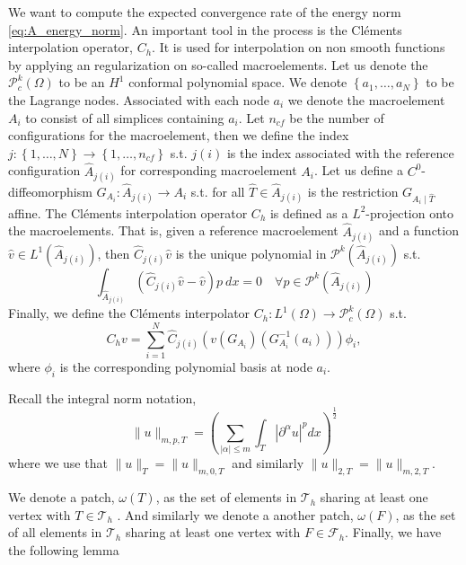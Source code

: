 We want to compute the expected convergence rate of the energy norm \eqref{eq:A_energy_norm}. An important tool in the process is the Cléments interpolation operator, $C_{h}$.
It is used for interpolation on non smooth functions by applying an regularization on so-called macroelements. Let us denote the $\mathcal{P}_{c}^{k}( \Omega )  $ to be an $H^{1}$ conformal polynomial space. We denote $\left\{ a_{1}, \ldots, a_{N}
\right\} $ to be the Lagrange nodes. Associated with each node $a_{i}$ we denote the macroelement $A_{i}$ to consist of all simplices containing $a_{i}$. Let $n_{cf}$ be the number of configurations for the macroelement, then we define the index $j:
\left\{ 1,\ldots,N \right\} \to \left\{ 1, \ldots, n_{cf} \right\}  $ s.t. $j( i) $ is the index associated with the reference configuration $\widehat{A}_{j(i) }$ for corresponding macroelement $A_{i}$. Let us define a $C^{0}$-diffeomorphism $G_{A_{i}}:
\widehat{A}_{j( i) } \to A_{i}$ s.t. for all $\widehat{T} \in \widehat{A}_{j( i) } $ is the restriction $G_{A_{i}  \mid \widehat{T}}$ affine. The Cléments interpolation operator $C_{h}$ is defined as a $L^2$-projection onto the macroelements. That is, given
a reference macroelement $\widehat{A}_{j( i) }$ and a function $\hat{v} \in L^{1}( \widehat{A}_{j( i) })  $, then $\widehat{C}_{j( i) } \hat{v}$  is the unique polynomial in $\mathcal{P}^{k} ( \widehat{A}_{j( i) })  $ s.t. \[
\int_{  \widehat{A}_{j( i) }}^{} ( \widehat{C}_{j( i) } \hat{v} - \hat{v}) p \ dx  = 0 \quad  \forall p \in \mathcal{P}^{k} ( \widehat{A}_{j( i) })
\]
Finally, we define the Cléments interpolator $C_{h} : L^{1}( \Omega )  \to \mathcal{P} ^{k}_{c}(\Omega  ) $ s.t.
\[
C_{h} v = \sum_{i=1}^{N} \widehat{C}_{j( i) } ( v (G_{A_{i}}) (G^{-1}_{A_{i}}(a_{i})) )\phi _{i},
\]
where $\phi _{i}$ is the corresponding polynomial basis at node $a_{i}$.

Recall the integral norm notation,
\[
\| u \|_{ m,p,T }^{  } = \left( \sum_{ \left\lvert \alpha  \right\rvert \le m}^{} \int_{T}^{}  \left\lvert  \partial ^{\alpha } u \right\rvert^{p} dx   \right)^{\frac{1}{2}}
\]
where we use that $\| u \|_{ T  }^{  } = \| u \|_{ m,0,T  }^{  } $ and similarly $\| u \|_{ 2,T  }^{  } = \| u \|_{ m,2,T  }^{  }  $.

We denote a patch, $\omega \left( T \right) $, as the set of elements in $\mathcal{T} _{h}$  sharing at least one vertex with $T \in \mathcal{T} _{h}$ . And similarly we denote a another patch, $\omega \left( F \right) $, as the set of all elements in $\mathcal{T}_{h} $
sharing at least one vertex with $F \in  \mathcal{F} _{h}$. Finally, we have the following lemma

